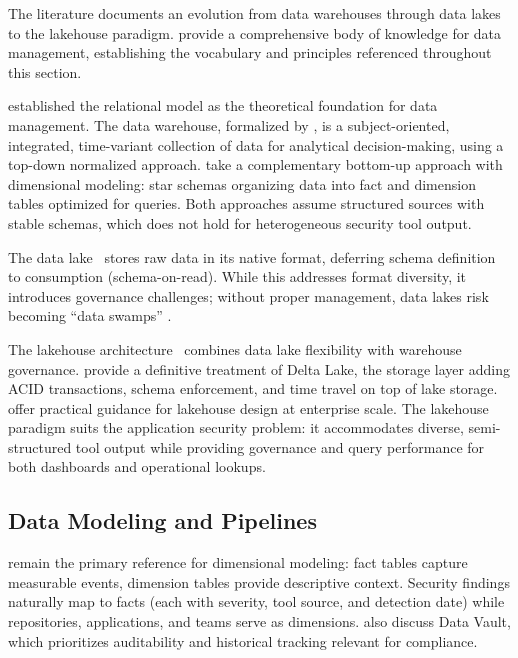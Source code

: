 The literature documents an evolution from data warehouses through data lakes to the lakehouse paradigm. \textcite{DAMA2017} provide a comprehensive body of knowledge for data management, establishing the vocabulary and principles referenced throughout this section.

\textcite{Codd1970} established the relational model as the theoretical foundation for data management. The data warehouse, formalized by \textcite{Inmon2005}, is a subject-oriented, integrated, time-variant collection of data for analytical decision-making, using a top-down normalized approach. \textcite{Kimball2013} take a complementary bottom-up approach with dimensional modeling: star schemas organizing data into fact and dimension tables optimized for queries. Both approaches assume structured sources with stable schemas, which does not hold for heterogeneous security tool output.

The data lake~\parencite{Miloslavskaya2016} stores raw data in its native format, deferring schema definition to consumption (schema-on-read). While this addresses format diversity, it introduces governance challenges; without proper management, data lakes risk becoming ``data swamps'' \parencite{DAMA2017}.

The lakehouse architecture~\parencite{Armbrust2021} combines data lake flexibility with warehouse governance. \textcite{Lee2024} provide a definitive treatment of Delta Lake, the storage layer adding ACID transactions, schema enforcement, and time travel on top of lake storage. \textcite{Thalpati2024} offer practical guidance for lakehouse design at enterprise scale. The lakehouse paradigm suits the application security problem: it accommodates diverse, semi-structured tool output while providing governance and query performance for both dashboards and operational lookups.

\subsection{Data Modeling and Pipelines}
\label{sec:data-modeling-pipelines}

\textcite{Kimball2013} remain the primary reference for dimensional modeling: fact tables capture measurable events, dimension tables provide descriptive context. Security findings naturally map to facts (each with severity, tool source, and detection date) while repositories, applications, and teams serve as dimensions. \textcite{DAMA2017} also discuss Data Vault, which prioritizes auditability and historical tracking relevant for compliance.

